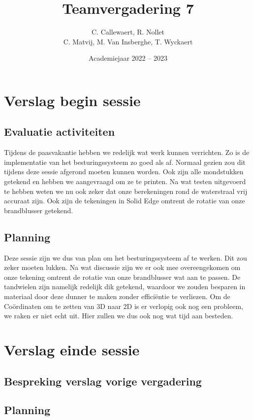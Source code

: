 \documentclass{kulakarticle}
\title{Teamvergadering 7}
\author{C. Callewaert, R. Nollet \\
	C. Matvij, M. Van Insberghe, T. Wyckaert }
\date{Academiejaar 2022 -- 2023}
\begin{document}
	\maketitle
\section{Verslag begin sessie}

	\subsection{Evaluatie activiteiten}
	
	Tijdens de paasvakantie hebben we redelijk wat werk kunnen verrichten. Zo is de implementatie van het besturingssysteem zo goed als af. Normaal gezien zou dit tijdens deze sessie afgerond moeten kunnen worden. Ook zijn alle mondstukken getekend en hebben we aangevraagd om ze te printen. Na wat testen uitgevoerd te hebben weten we nu ook zeker dat onze berekeningen rond de waterstraal vrij accuraat zijn. Ook zijn de tekeningen in Solid Edge omtrent de rotatie van onze brandblusser getekend. 
	
	\subsection{Planning}
	Deze sessie zijn we dus van plan om het besturingssysteem af te werken. Dit zou zeker moeten lukken. 
	Na wat discussie zijn we er ook mee overeengekomen om onze tekening omtrent de rotatie van onze brandblusser wat aan te passen. De tandwielen zijn namelijk redelijk dik getekend, waardoor we zouden besparen in  materiaal door deze dunner te maken zonder efficiëntie te verliezen. Om de Coördinaten om te zetten van 3D naar 2D is er verlopig ook nog een probleem, we raken er niet echt uit. Hier zullen we dus ook nog wat tijd aan besteden.
\section{Verslag einde sessie}

	\subsection{Bespreking verslag vorige vergadering}
	
	
	\subsection{Planning}

	
\end{document}
